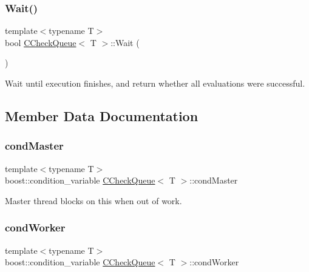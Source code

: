 \mbox{\label{class_c_check_queue_a4ff3e0e8241491efa1803eeb3a53e7fa}} 
\subsubsection{\texorpdfstring{Wait()}{Wait()}}
{\footnotesize\ttfamily template$<$typename T$>$ \\
bool \mbox{\hyperlink{class_c_check_queue}{C\+Check\+Queue}}$<$ T $>$\+::Wait (\begin{DoxyParamCaption}{ }\end{DoxyParamCaption})\hspace{0.3cm}{\ttfamily [inline]}}



Wait until execution finishes, and return whether all evaluations were successful. 



\subsection{Member Data Documentation}
\mbox{\label{class_c_check_queue_aa0227186df5be5eaa7d1477a8c8b7f1f}} 
\subsubsection{\texorpdfstring{cond\+Master}{condMaster}}
{\footnotesize\ttfamily template$<$typename T$>$ \\
boost\+::condition\+\_\+variable \mbox{\hyperlink{class_c_check_queue}{C\+Check\+Queue}}$<$ T $>$\+::cond\+Master\hspace{0.3cm}{\ttfamily [private]}}



Master thread blocks on this when out of work. 

\mbox{\label{class_c_check_queue_ac13d399e7ba30792618978ef5cc35aaf}} 
\subsubsection{\texorpdfstring{cond\+Worker}{condWorker}}
{\footnotesize\ttfamily template$<$typename T$>$ \\
boost\+::condition\+\_\+variable \mbox{\hyperlink{class_c_check_queue}{C\+Check\+Queue}}$<$ T $>$\+::cond\+Worker\hspace{0.3cm}{\ttfamily [private]}}




